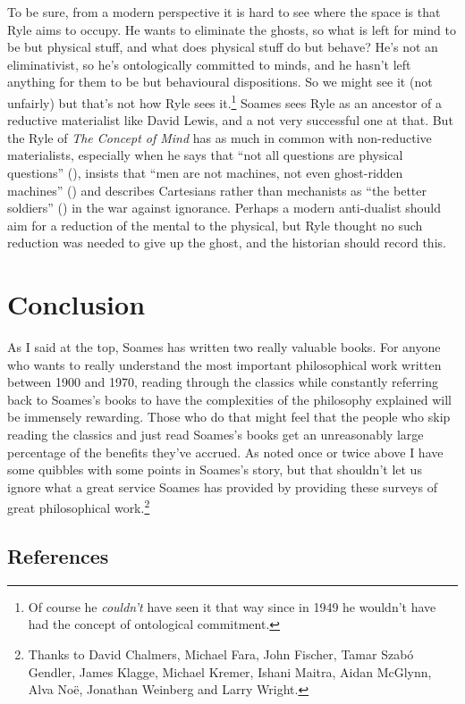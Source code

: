 \documentclass[
  11pt,
  letterpaper,
  DIV=11,
  numbers=noendperiod,
  twoside]{scrartcl}
\begin{document}
To be sure, from a modern perspective it is hard to see where the space
is that Ryle aims to occupy. He wants to eliminate the ghosts, so what
is left for mind to be but physical stuff, and what does physical stuff
do but behave? He's not an eliminativist, so he's ontologically
committed to minds, and he hasn't left anything for them to be but
behavioural dispositions. So we might see it (not unfairly) but that's
not how Ryle sees it.\footnote{Of course he \emph{couldn't} have seen it
  that way since in 1949 he wouldn't have had the concept of ontological
  commitment.} Soames sees Ryle as an ancestor of a reductive
materialist like David Lewis, and a not very successful one at that. But
the Ryle of \emph{The Concept of Mind} has as much in common with
non-reductive materialists, especially when he says that ``not all
questions are physical questions'' (),
insists that ``men are not machines, not even ghost-ridden machines''
() and describes Cartesians rather than
mechanists as ``the better soldiers'' () in the war against ignorance. Perhaps a modern anti-dualist should
aim for a reduction of the mental to the physical, but Ryle thought no
such reduction was needed to give up the ghost, and the historian should
record this.

\section{Conclusion}\label{conclusion}

As I said at the top, Soames has written two really valuable books. For
anyone who wants to really understand the most important philosophical
work written between 1900 and 1970, reading through the classics while
constantly referring back to Soames's books to have the complexities of
the philosophy explained will be immensely rewarding. Those who do that
might feel that the people who skip reading the classics and just read
Soames's books get an unreasonably large percentage of the benefits
they've accrued. As noted once or twice above I have some quibbles with
some points in Soames's story, but that shouldn't let us ignore what a
great service Soames has provided by providing these surveys of great
philosophical work.\footnote{Thanks to David Chalmers, Michael Fara,
  John Fischer, Tamar Szabó Gendler, James Klagge, Michael Kremer,
  Ishani Maitra, Aidan McGlynn, Alva Noë, Jonathan Weinberg and Larry
  Wright.}

\subsection*{References}\label{references}
\end{document}
